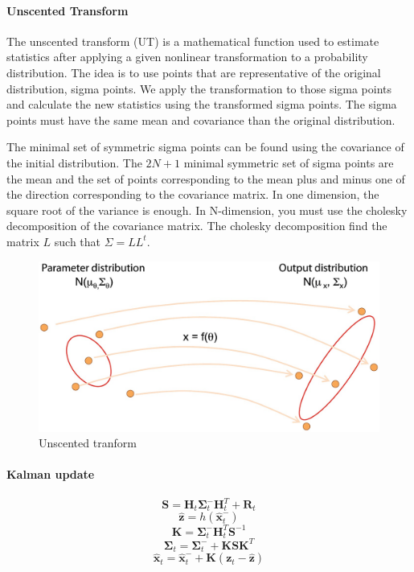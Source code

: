 \documentclass[12pt,]{article}
\let\savedparagraph\paragraph %
\let\paragraph\oldparagraph %
\let\paragraph\savedparagraph %
\let\oldparagraph\paragraph
\renewcommand{\paragraph}[1]{\oldparagraph{#1}\mbox{}}
\begin{document}
\paragraph{Unscented Transform}\label{unscented-transform}

The unscented transform (UT) is a mathematical function used to estimate
statistics after applying a given nonlinear transformation to a
probability distribution. The idea is to use points that are
representative of the original distribution, sigma points. We apply the
transformation to those sigma points and calculate the new statistics
using the transformed sigma points. The sigma points must have the same
mean and covariance than the original distribution.

The minimal set of symmetric sigma points can be found using the
covariance of the initial distribution. The \(2N + 1\) minimal symmetric
set of sigma points are the mean and the set of points corresponding to
the mean plus and minus one of the direction corresponding to the
covariance matrix. In one dimension, the square root of the variance is
enough. In N-dimension, you must use the cholesky decomposition of the
covariance matrix. The cholesky decomposition find the matrix \(L\) such
that \(\Sigma = LL^t\).

\begin{figure}
\centering
\includegraphics{unscented.jpg}
\caption{Unscented tranform}
\end{figure}

\paragraph{Kalman update}\label{kalman-update}

\[\mathbf{S} = \mathbf{H}_t \mathbf{\Sigma}^{-}_t \mathbf{H}_t^T + \mathbf{R}_t\]
\[\hat{\mathbf{z}} = h(\hat{\mathbf{x}}^{-}_t)\]
\[\mathbf{K} = \mathbf{\Sigma}^{-}_t \mathbf{H}_t^T \mathbf{S}^{-1}\]
\[\mathbf{\Sigma}_t = \mathbf{\Sigma}^-_t + \mathbf{K} \mathbf{S} \mathbf{K}^T\]
\[\hat{\mathbf{x}}_t = \hat{\mathbf{x}}^{-}_t + \mathbf{K}(\mathbf{z}_t - \hat{\mathbf{z}})\]
\end{document}
